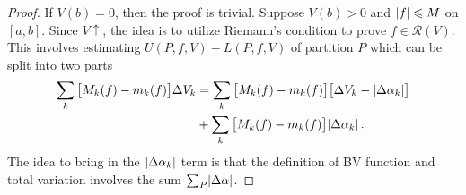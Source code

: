 \documentclass{article}
\newcommand{\Riemann}{\mathcal R}
\DeclarePairedDelimiter\abs{\lvert}{\rvert}
\newcommand{\increasing}{\uparrow}
\begin{document}
\begin{proof}
    If $ V(b) = 0 $, then the proof is trivial. Suppose $ V(b) > 0 $ and $ \abs{ f } \leqslant M $ on $ [a, b] $. Since $ V \increasing $, the idea is to utilize Riemann's condition to prove $ f \in \Riemann(V) $. This involves estimating $ U(P, f, V) - L(P, f, V) $ of partition $ P $ which can be split into two parts
    \begin{align*}
        \sum_k \big[ M_k(f) - m_k(f) \big] \Delta V_k &= \sum_k \big[ M_k(f) - m_k(f) \big] \big[ \Delta V_k - \abs{ \Delta \alpha_k } \big] \\  
        &+ \sum_k \big[ M_k(f) - m_k(f) \big] \abs{ \Delta \alpha_k } \,.
    \end{align*}
    The idea to bring in the $ \abs{ \Delta \alpha_k } $ term is that the definition of BV function and total variation involves the sum $ \sum_{P} \abs{ \Delta \alpha } $.


\end{proof}
\end{document}

